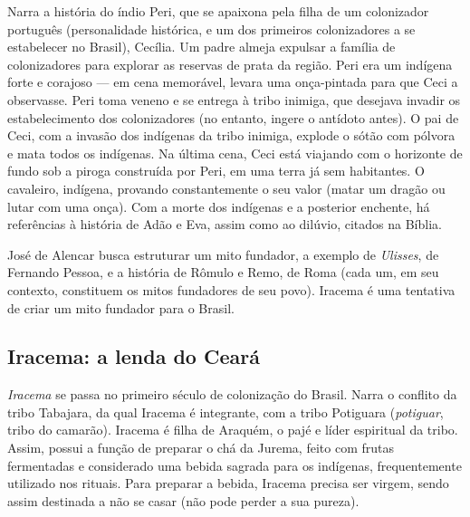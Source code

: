 Narra a história do índio Peri, que se apaixona pela filha de um colonizador português (personalidade histórica, e um dos primeiros colonizadores a se estabelecer no Brasil), Cecília. Um padre almeja expulsar a família de colonizadores para explorar as reservas de prata da região. Peri era um indígena forte e corajoso — em cena memorável, levara uma onça-pintada para que Ceci a observasse. Peri toma veneno e se entrega à tribo inimiga, que desejava invadir os estabelecimento dos colonizadores (no entanto, ingere o antídoto antes). O pai de Ceci, com a invasão dos indígenas da tribo inimiga, explode o sótão com pólvora e mata todos os indígenas. Na última cena, Ceci está viajando com o horizonte de fundo sob a piroga construída por Peri, em uma terra já sem habitantes. O cavaleiro, indígena, provando constantemente o seu valor (matar um dragão ou lutar com uma onça). Com a morte dos indígenas e a posterior enchente, há referências à história de Adão e Eva, assim como ao dilúvio, citados na Bíblia.

José de Alencar busca estruturar um mito fundador, a exemplo de \textit{Ulisses}, de Fernando Pessoa, e a história de Rômulo e Remo, de Roma (cada um, em seu contexto, constituem os mitos fundadores de seu povo). Iracema é uma tentativa de criar um mito fundador para o Brasil.

\subsection{Iracema: a lenda do Ceará}

\textit{Iracema} se passa no primeiro século de colonização do Brasil. Narra o conflito da tribo Tabajara, da qual Iracema é integrante, com a tribo Potiguara (\textit{potiguar}, tribo do camarão). Iracema é filha de Araquém, o pajé e líder espiritual da tribo. Assim, possui a função de preparar o chá da Jurema, feito com frutas fermentadas e considerado uma bebida sagrada para os indígenas, frequentemente utilizado nos rituais. Para preparar a bebida, Iracema precisa ser virgem, sendo assim destinada a não se casar (não pode perder a sua pureza).

